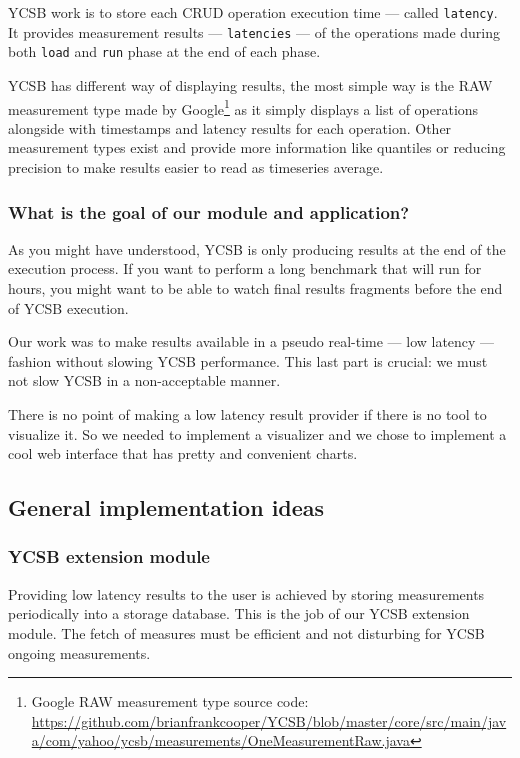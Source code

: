 \documentclass[a4paper,11pt]{report}
\begin{document}
YCSB work is to store each CRUD operation execution time --- called \texttt{latency}. It provides measurement results --- \texttt{latencies} --- of the operations made during both \texttt{load} and \texttt{run} phase at the end of each phase.

YCSB has different way of displaying results, the most simple way is the RAW measurement type made by Google\footnote{Google RAW measurement type source code: \url{https://github.com/brianfrankcooper/YCSB/blob/master/core/src/main/java/com/yahoo/ycsb/measurements/OneMeasurementRaw.java}} as it simply displays a list of operations alongside with timestamps and latency results for each operation. Other measurement types exist and provide more information like quantiles or reducing precision to make results easier to read as timeseries average.

\subsubsection{What is the goal of our module and application?}

As you might have understood, YCSB is only producing results at the end of the execution process. If you want to perform a long benchmark that will run for hours, you might want to be able to watch final results fragments before the end of YCSB execution.

\bigskip

Our work was to make results available in a pseudo real-time --- low latency --- fashion without slowing YCSB performance. This last part is crucial: we must not slow YCSB in a non-acceptable manner.

There is no point of making a low latency result provider if there is no tool to visualize it. So we needed to implement a visualizer and we chose to implement a cool web interface that has pretty and convenient charts.

\subsection{General implementation ideas}

\subsubsection{YCSB extension module}

Providing low latency results to the user is achieved by storing measurements periodically into a storage database. This is the job of our YCSB extension module. The fetch of measures must be efficient and not disturbing for YCSB ongoing measurements.
\end{document}
